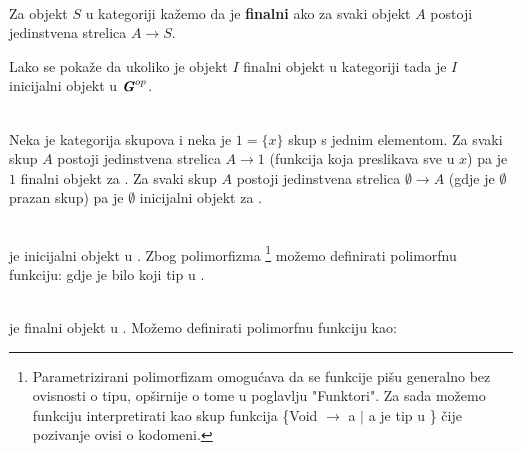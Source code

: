   \begin{definition}\ \\
  
    \noindent Za objekt $S$ u kategoriji  kažemo da je \textbf{finalni} ako za svaki
    objekt $A$ postoji jedinstvena strelica $A \xrightarrow{} S$.\\
  \end{definition}
  
  Lako se pokaže da ukoliko je objekt $I$ finalni objekt u kategoriji  tada je $I$ inicijalni objekt u $\textbf{\emph{G}}^{op}$.\\
  
  \begin{example}\ \\
  
    \noindent Neka je  kategorija skupova i neka je $1 = \{x\}$ skup s jednim elementom. Za svaki skup $A$ postoji jedinstvena strelica $A \xrightarrow{} 1$ (funkcija koja preslikava sve u $x$) pa je $1$ finalni objekt za . Za svaki skup $A$ postoji jedinstvena strelica $\emptyset \xrightarrow{} A$ (gdje je $\emptyset$ prazan skup) pa je $\emptyset$ inicijalni objekt za .\\
  
  \end{example}
  
  \begin{example}\ \\
  
  \noindent {} je inicijalni objekt u .
    Zbog polimorfizma \footnote{Parametrizirani polimorfizam omogućava da se
      funkcije pišu generalno bez ovisnosti o tipu, opširnije o tome u
      poglavlju "Funktori". Za sada možemo funkciju 
      interpretirati kao skup funkcija \{Void $\to$ a $|$ a je tip u
      \} čije pozivanje ovisi o kodomeni.} možemo definirati polimorfnu funkciju:
    gdje je  bilo koji tip u .\\
  
  \end{example}
  
  \begin{example}\ \\
  
  \noindent \codei{()} je finalni objekt u .
    Možemo definirati polimorfnu funkciju  kao:
  \end{example}
  
